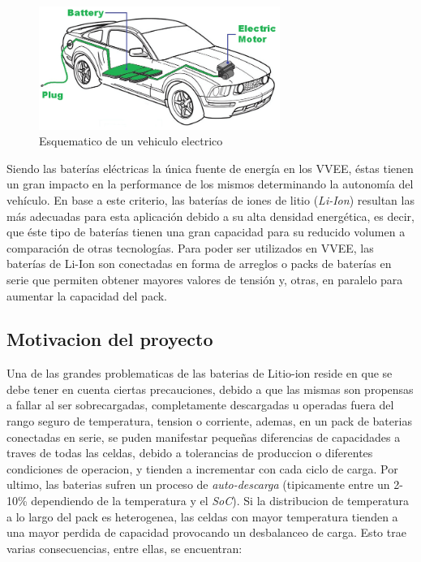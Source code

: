 \documentclass[10pt,a4paper]{article}
\begin{document}
    \begin{figure}[h!]
        \begin{center}
            \includegraphics[width=0.7\textwidth]{EV.png}
            \caption{Esquematico de un vehiculo electrico}
            \label{EV}
        \end{center}
    \end{figure}


	\noindent Siendo las baterías eléctricas la única fuente de energía en los 
    VVEE, éstas tienen un gran impacto en la performance de los mismos 
    determinando la autonomía del vehículo. En base a este criterio, las 
    baterías de iones de litio (\emph{Li-Ion}) resultan las más adecuadas para 
    esta aplicación debido a su alta densidad energética, es decir, que éste 
    tipo de baterías tienen una gran capacidad para su reducido volumen a 
    comparación de otras tecnologías. Para poder ser utilizados en VVEE, las 
    baterías de Li-Ion son conectadas en forma de arreglos o packs de baterías 
    en serie que permiten obtener mayores valores de tensión y, otras, en 
    paralelo para aumentar la capacidad del pack. 

    \subsection{Motivacion del proyecto}
	
	\noindent Una de las grandes problematicas de las baterias de Litio-ion 
    reside en que se debe tener en cuenta ciertas precauciones,
    debido a que las mismas son propensas a fallar al ser sobrecargadas, 
    completamente descargadas u operadas fuera del
    rango seguro de temperatura, tension o corriente, ademas, en un pack de 
    baterias conectadas en serie, se puden manifestar pequeñas diferencias de 
    capacidades a traves de todas las celdas, debido a tolerancias de
    produccion o diferentes condiciones de operacion, y tienden
    a incrementar con cada ciclo de carga. Por ultimo, las baterias
    sufren un proceso de \emph{auto-descarga} (tipicamente entre un
    2-10\% dependiendo de la temperatura y el \emph{SoC}). Si la
    distribucion de temperatura a lo largo del pack es
    heterogenea, las celdas con mayor temperatura tienden a una mayor
    perdida de capacidad provocando un desbalanceo de carga.
    Esto trae varias consecuencias, entre ellas, se encuentran:
\end{document}
